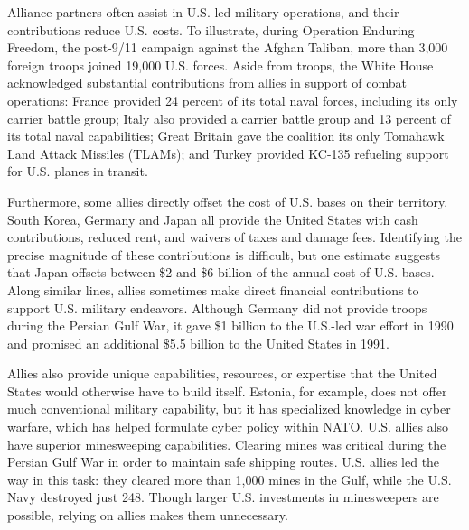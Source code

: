Alliance partners often assist in U.S.-led military operations, and their contributions reduce U.S. costs.\autocite{krepscoalitions11} To illustrate, during Operation Enduring Freedom, the post-9/11 campaign against the Afghan Taliban, more than 3,000 foreign troops joined 19,000 U.S. forces.\autocite{DOS20060131} Aside from troops, the White House acknowledged substantial contributions from allies in support of combat operations: France provided 24 percent of its total naval forces, including its only carrier battle group; Italy also provided a carrier battle group and 13 percent of its total naval capabilities; Great Britain gave the coalition its only Tomahawk Land Attack Missiles (TLAMs); and Turkey provided KC-135 refueling support for U.S. planes in transit.\autocite{WHnd} 

Furthermore, some allies directly offset the cost of U.S. bases on their territory. South Korea, Germany and Japan all provide the United States with cash contributions, reduced rent, and waivers of taxes and damage fees. Identifying the precise magnitude of these contributions is difficult, but one estimate suggests that Japan offsets between \$2 and \$6 billion of the annual cost of U.S. bases.\autocite[143-49]{randoverseas13} Along similar lines, allies sometimes make direct financial contributions to support U.S. military endeavors. Although Germany did not provide troops during the Persian Gulf War, it gave \$1 billion to the U.S.-led war effort in 1990 and promised an additional \$5.5 billion to the United States in 1991.\autocite{goshkoWP91}

Allies also provide unique capabilities, resources, or expertise that the United States would otherwise have to build itself. Estonia, for example, does not offer much conventional military capability, but it has specialized knowledge in cyber warfare, which has helped formulate cyber policy within NATO.\autocite{lingreenbergTNSR20} U.S. allies also have superior minesweeping capabilities. Clearing mines was critical during the Persian Gulf War in order to maintain safe shipping routes. U.S. allies led the way in this task: they cleared more than 1,000 mines in the Gulf, while the U.S. Navy destroyed just 248.\autocite{thompson2013lessons} Though larger U.S. investments in minesweepers are possible, relying on allies makes them unnecessary. 

